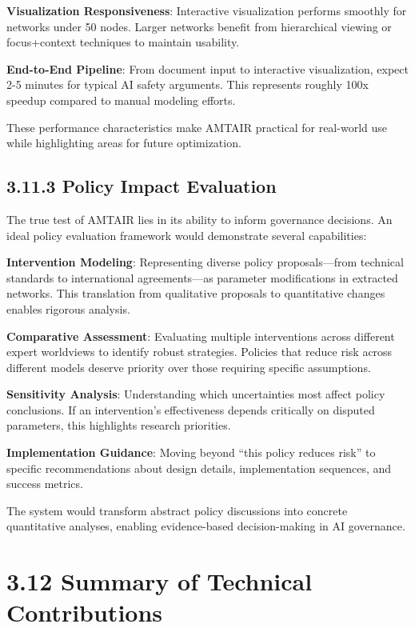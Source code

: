 \documentclass[
  11pt,
  letterpaper,
]{book}
\begin{document}
\textbf{Visualization Responsiveness}: Interactive visualization
performs smoothly for networks under 50 nodes. Larger networks benefit
from hierarchical viewing or focus+context techniques to maintain
usability.

\textbf{End-to-End Pipeline}: From document input to interactive
visualization, expect 2-5 minutes for typical AI safety arguments. This
represents roughly 100x speedup compared to manual modeling efforts.

These performance characteristics make AMTAIR practical for real-world
use while highlighting areas for future optimization.

\subsection{3.11.3 Policy Impact Evaluation}\label{sec-policy-impact}

The true test of AMTAIR lies in its ability to inform governance
decisions. An ideal policy evaluation framework would demonstrate
several capabilities:

\textbf{Intervention Modeling}: Representing diverse policy
proposals---from technical standards to international agreements---as
parameter modifications in extracted networks. This translation from
qualitative proposals to quantitative changes enables rigorous analysis.

\textbf{Comparative Assessment}: Evaluating multiple interventions
across different expert worldviews to identify robust strategies.
Policies that reduce risk across different models deserve priority over
those requiring specific assumptions.

\textbf{Sensitivity Analysis}: Understanding which uncertainties most
affect policy conclusions. If an intervention's effectiveness depends
critically on disputed parameters, this highlights research priorities.

\textbf{Implementation Guidance}: Moving beyond ``this policy reduces
risk'' to specific recommendations about design details, implementation
sequences, and success metrics.

The system would transform abstract policy discussions into concrete
quantitative analyses, enabling evidence-based decision-making in AI
governance.

\section{3.12 Summary of Technical
Contributions}\label{sec-technical-summary}
\end{document}
